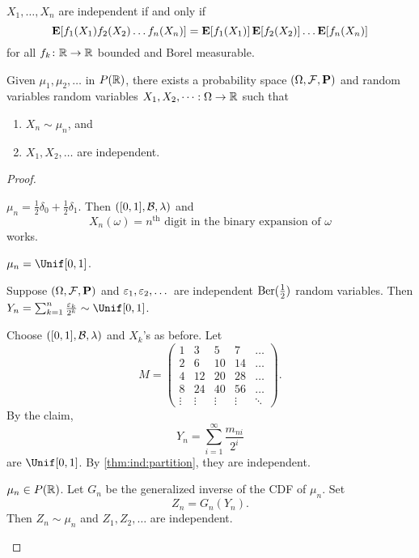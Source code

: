 \begin{corollary}
    $X_1, \dots, X_n$ are independent if and only if \[
        \operatorname{\mathbf E}[f_1(X_1) f_2(X_2) \dots f_n(X_n)]
             = \operatorname{\mathbf E}[f_1(X_1)] \operatorname{\mathbf E}[f_2(X_2)] \dots \operatorname{\mathbf E}[f_n(X_n)]
    \] for all $f_k\colon \mathbb{R} \to \mathbb{R}$ bounded and Borel measurable.
\end{corollary}

\begin{theorem*} \label{thm:d-k}
    Given $\mu_1, \mu_2, \dots$ in $P(\mathbb{R})$, there exists a probability
    space $(\Omega, \mathcal F, \operatorname{\mathbf P})$ and random variables random variables
    $X_1, X_2, \dots : \Omega \to \mathbb{R}$ such that
    \begin{enumerate}
        \item $X_n \sim \mu_n$, and
        \item $X_1, X_2, \dots$ are independent.
    \end{enumerate}
\end{theorem*}
\begin{proof} \leavevmode
    \begin{casework}
        \item $\mu_n = \frac12 \delta_0 + \frac12 \delta_1$.
        Then $([0, 1], \mathcal{B}, \lambda)$ and \[
            X_n(\omega) = n^{\text{th}} \text{ digit in the binary expansion
                of } \omega
        \] works. \TODO %
        \item $\mu_n = \Unif[0, 1]$.
        \begin{claim}
            Suppose $(\Omega, \mathcal F, \operatorname{\mathbf P})$ and $\varepsilon_1, \varepsilon_2, \dots$ are
            independent $\operatorname{Ber}(\frac12)$ random variables.
            Then $Y_n = \sum_{k=1}^n \frac{\eps_k}{2^k} \sim \Unif[0, 1]$.
        \end{claim}
        Choose $([0, 1], \mathcal{B}, \lambda)$ and $X_k$'s as before.
        Let \[
            M = \begin{pmatrix}
                1 & 3 & 5 & 7 & \dots \\
                2 & 6 & 10 & 14 & \dots \\
                4 & 12 & 20 & 28 & \dots \\
                8 & 24 & 40 & 56 & \dots \\
                \vdots & \vdots & \vdots & \vdots & \ddots
            \end{pmatrix}.
        \]
        By the claim, \[
            Y_n = \sum_{i=1}^\infty \frac{m_{ni}}{2^i}
        \]
        are $\Unif[0, 1]$.
        By \cref{thm:ind:partition}, they are independent.
        \item $\mu_n \in P(\mathbb{R})$.
        Let $G_n$ be the generalized inverse of the CDF of $\mu_n$.
        Set \[
            Z_n = G_n(Y_n).
        \] Then $Z_n \sim \mu_n$ and $Z_1, Z_2, \dots$ are independent.
    \end{casework}
\end{proof}

